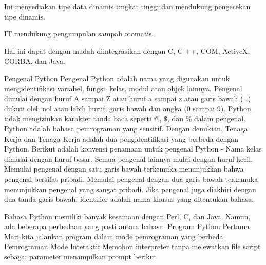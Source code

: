 \vspace{14pt}
\noindent 
{\fontsize{14pt}{14pt}\selectfont Ini menyediakan tipe data dinamis tingkat tinggi dan mendukung pengecekan tipe dinamis. \\} \par
\vspace{14pt}
\noindent 
{\fontsize{14pt}{14pt}\selectfont IT mendukung pengumpulan sampah otomatis. \\} \par
\vspace{14pt}
\noindent 
{\fontsize{14pt}{14pt}\selectfont Hal ini dapat dengan mudah diintegrasikan dengan C, C ++, COM, ActiveX, CORBA, dan Java. \\} \par
\vspace{14pt}
\noindent 
{\fontsize{14pt}{14pt}\selectfont Pengenal Python Pengenal Python adalah nama yang digunakan untuk mengidentifikasi variabel, fungsi, kelas, modul atau objek lainnya. Pengenal dimulai dengan huruf A sampai Z atau huruf a sampai z atau garis bawah ( $  \_  $) diikuti oleh nol atau lebih huruf, garis bawah dan angka (0 sampai 9). Python tidak mengizinkan karakter tanda baca seperti @,  $  \$  $, dan $  \%  $ dalam pengenal. Python adalah bahasa pemrograman yang sensitif. Dengan demikian, Tenaga Kerja dan Tenaga Kerja adalah dua pengidentifikasi yang berbeda dengan Python. Berikut adalah konvensi penamaan untuk pengenal Python - Nama kelas dimulai dengan huruf besar. Semua pengenal lainnya mulai dengan huruf kecil. Memulai pengenal dengan satu garis bawah terkemuka menunjukkan bahwa pengenal bersifat pribadi. Memulai pengenal dengan dua garis bawah terkemuka menunjukkan pengenal yang sangat pribadi. Jika pengenal juga diakhiri dengan dua tanda garis bawah, identifier adalah nama khusus yang ditentukan bahasa. \\} \par
\vspace{14pt}
\noindent 
{\fontsize{14pt}{14pt}\selectfont \vspace{\baselineskip}
Bahasa Python memiliki banyak kesamaan dengan Perl, C, dan Java. Namun, ada beberapa perbedaan yang pasti antara bahasa. Program Python Pertama Mari kita jalankan program dalam mode pemrograman yang berbeda. Pemrograman Mode Interaktif Memohon interpreter tanpa melewatkan file script sebagai parameter menampilkan prompt berikut  \\} \par
\vspace{14pt}
\noindent 
